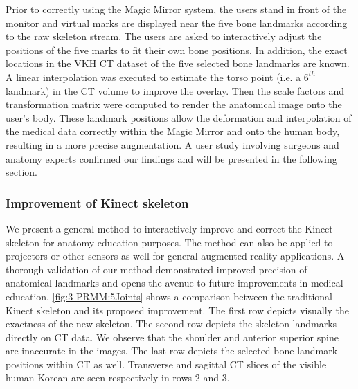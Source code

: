 Prior to correctly using the Magic Mirror system, the users stand in front of the monitor and virtual marks are displayed near the five bone landmarks according to the raw skeleton stream. The users are asked to interactively adjust the positions of the five marks to fit their own bone positions. In addition, the exact locations in the VKH CT dataset of the five selected bone landmarks are known. A linear interpolation was executed to estimate the torso point (i.e. a $6^{th}$ landmark) in the CT volume to improve the overlay. Then the scale factors and transformation matrix were computed to render the anatomical image onto the user's body. These landmark positions allow the deformation and interpolation of the medical data correctly within the Magic Mirror and onto the human body, resulting in a more precise augmentation. A user study involving surgeons and anatomy experts confirmed our findings and will be presented in the following section.

\subsubsection{Improvement of Kinect skeleton}
We present a general method to interactively improve and correct the Kinect skeleton for anatomy education purposes. The method can also be applied to projectors or other sensors as well for general augmented reality applications. A thorough validation of our method demonstrated improved precision of anatomical landmarks and opens the avenue to future improvements in medical education. 
\figurename{\ref{fig:3-PRMM:5Joints}} shows a comparison between the traditional Kinect skeleton and its proposed improvement. The first row depicts visually the exactness of the new skeleton. The second row depicts the skeleton landmarks directly on CT data. We observe that the shoulder and anterior superior spine are inaccurate in the images. The last row depicts the selected bone landmark positions within CT as well. Transverse and sagittal CT slices of the visible human Korean are seen respectively in rows 2 and 3.

